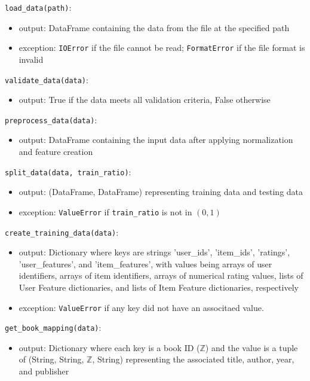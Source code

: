 \documentclass[12pt, titlepage]{article}
\begin{document}
\noindent \texttt{load\_data(path)}:
\begin{itemize}
\item output: DataFrame containing the data from the file at the specified path
\item exception: \texttt{IOError} if the file cannot be read; \texttt{FormatError} if the file format is invalid
\end{itemize}

\noindent \texttt{validate\_data(data)}:
\begin{itemize}
\item output: True if the data meets all validation criteria, False otherwise
\end{itemize}

\noindent \texttt{preprocess\_data(data)}:
\begin{itemize}
\item output: DataFrame containing the input data after applying normalization and feature creation
\end{itemize}

\noindent \texttt{split\_data(data, train\_ratio)}:
\begin{itemize}
\item output: (DataFrame, DataFrame) representing training data and testing data
\item exception: \texttt{ValueError} if \texttt{train\_ratio} is not in $(0,1)$
\end{itemize}

\noindent \texttt{create\_training\_data(data)}:
\begin{itemize}
\item output: Dictionary where keys are strings 'user\_ids', 'item\_ids', 'ratings', 'user\_features', and 'item\_features', with values being arrays of user identifiers, arrays of item identifiers, arrays of numerical rating values, lists of User Feature dictionaries, and lists of Item Feature dictionaries, respectively
\item exception: \texttt{ValueError} if any key did not have an associtaed value.
\end{itemize}

\noindent \texttt{get\_book\_mapping(data)}:
\begin{itemize}
\item output: Dictionary where each key is a book ID ($\mathbb{Z}$) and the value is a tuple of (String, String, $\mathbb{Z}$, String) representing the associated title, author, year, and publisher
\end{itemize}
\end{document}
